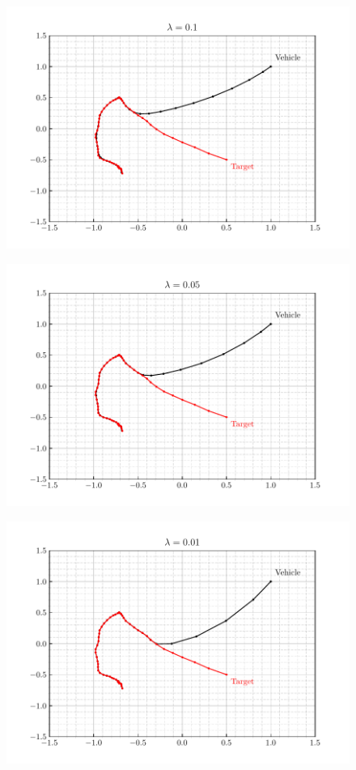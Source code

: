 \documentclass[12pt]{article}
\begin{document}
\begin{figure}[H]
    \centering
    \includegraphics{../../src/task_1/output/ex_1_i=5.pdf}
\end{figure}

\begin{figure}[H]
    \centering
    \includegraphics{../../src/task_1/output/ex_1_i=6.pdf}
\end{figure}

\begin{figure}[H]
    \centering
    \includegraphics{../../src/task_1/output/ex_1_i=7.pdf}
\end{figure}
\end{document}
